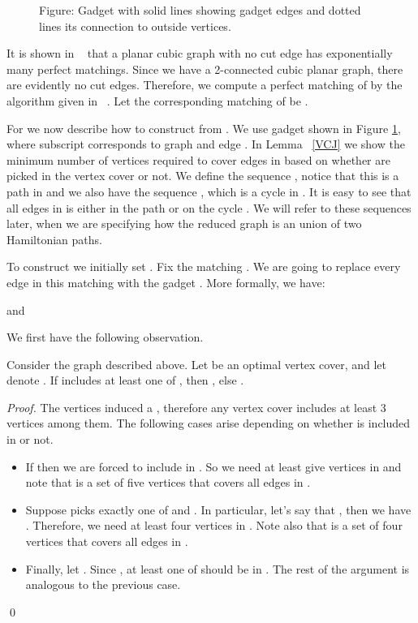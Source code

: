 \documentclass[svgnames]{llncs}
\begin{document}
{\begin{figure}[!ht]
\caption{Figure: Gadget  with solid lines showing gadget edges and dotted lines its connection to outside vertices.}
 \label{J}
\end{figure}

It is shown in ~\cite{Chudnovsky08perfectmatchings} that a planar cubic graph with no cut edge has exponentially many perfect matchings. Since we have a 2-connected cubic planar graph, there are evidently no cut edges. Therefore, we compute a perfect matching 
of  by the algorithm given in ~\cite{4567800}. Let the corresponding matching of  be .



For  we now describe how to construct  from . We use gadget  shown in Figure \ref{J}, where subscript  corresponds to graph  and edge . In Lemma ~\ref{VCJ}
we show the minimum number of vertices required to cover edges in  based on whether  are picked in the vertex cover or not. We define the sequence
, notice that this is a path in  and we also have the sequence , which is a cycle in . It is easy to see that all edges in  is either in the path  or on the cycle . We will refer to these sequences later, when we are specifying how the reduced graph is an union of two Hamiltonian paths. 


To construct  we initially set .
Fix the matching . We are going to replace every edge in this matching with the gadget . More formally, we have:
 

and  



We first have the following observation.



\begin{lemma}
Consider the graph  described above. Let  be an optimal vertex cover, and let  denote . If  includes at least one of , then , else .
\label{VCJ}
\end{lemma}

\begin{proof}
The vertices  induced a , therefore any vertex cover includes at least 3 vertices among them. The following cases arise depending on whether  is included in  or not.
\begin{itemize}
 \item [case 1] If  then we are forced to include  in . So we need at least give vertices in  and note that  is a set of five vertices that covers all edges in .
 \item [case 2] Suppose  picks exactly one of  and . In particular, let's say that , then we have . Therefore, we need at least four vertices in . Note also that  is a set of four vertices that covers all edges in .
 \item [case 3]  Finally, let . Since , at least one of  should be in . The rest of the argument is analogous to the previous case.
\end{itemize}
\qed
\end{proof}


}
\end{document}
